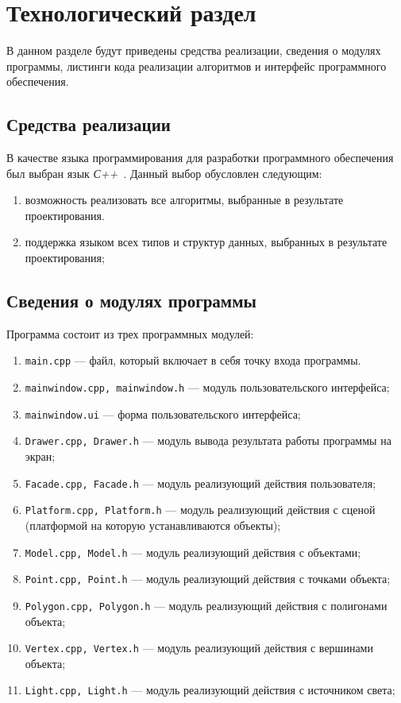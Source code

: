 \chapter{Технологический раздел}

В данном разделе будут приведены средства реализации, сведения о модулях программы, 	листинги кода реализации алгоритмов и интерфейс программного обеспечения.

\section{Средства реализации}

В качестве языка программирования для разработки программного обеспечения был выбран язык \textit{С++}~\cite{cplusplus}.
Данный выбор обусловлен следующим: 
\begin{enumerate}
	\item возможность реализовать все алгоритмы, выбранные в результате проектирования.
	\item поддержка языком всех типов и структур данных, выбранных в результате
	проектирования;
\end{enumerate}

\section{Сведения о модулях программы}
Программа состоит из трех программных модулей:
\begin{enumerate}
	\item \texttt{main.cpp} --- файл, который включает в себя точку входа программы.
	\item \texttt{mainwindow.cpp, mainwindow.h} --- модуль пользовательского интерфейса;
	\item \texttt{mainwindow.ui} --- форма пользовательского интерфейса;
	\item \texttt{Drawer.cpp, Drawer.h} --- модуль вывода результата работы программы на экран;
	\item \texttt{Facade.cpp, Facade.h} --- модуль реализующий действия пользователя;
	\item \texttt{Platform.cpp, Platform.h} --- модуль реализующий действия с сценой (платформой на которую устанавливаются объекты);
	\item \texttt{Model.cpp, Model.h} --- модуль реализующий действия с объектами;
	\item \texttt{Point.cpp, Point.h} --- модуль реализующий действия с точками объекта;
	\item \texttt{Polygon.cpp, Polygon.h} --- модуль реализующий действия с полигонами объекта;
	\item \texttt{Vertex.cpp, Vertex.h} --- модуль реализующий действия с вершинами объекта;
	\item \texttt{Light.cpp, Light.h} --- модуль реализующий действия с источником света;
\end{enumerate}

